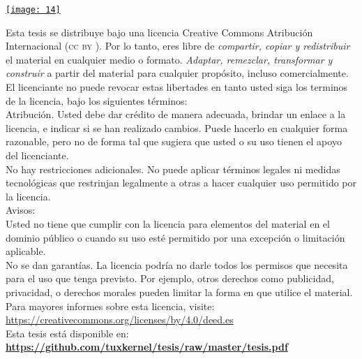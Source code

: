 \documentclass[14pt,letterpaper,twoside]{extbook} %
\begin{document}
\begin{scriptsize}
\begin{minipage}{7.5cm}
 
\begin{minipage}{7.5cm}
\href{https://creativecommons.org/licenses/by/4.0/deed.es}{\texttt{[image: 14]}} \\
\end{minipage}

\noindent Esta tesis se distribuye bajo una licencia Creative Commons Atribución  Internacional (\textsc{cc by} ). Por lo tanto, eres libre de \emph{compartir, copiar y redistribuir} el material en cualquier medio o formato. \emph{Adaptar, remezclar, transformar y construir} a partir del material para cualquier propósito, incluso comercialmente. El licenciante no puede revocar estas libertades en tanto usted siga los terminos de la licencia, bajo los siguientes términos: \\

\noindent \ccAttribution \thinspace Atribución. Usted debe dar crédito de manera adecuada, brindar un enlace a la licencia, e indicar si se han realizado cambios. Puede hacerlo en cualquier forma razonable, pero no de forma tal que sugiera que usted o su uso tienen el apoyo del licenciante. \\

\noindent No hay restricciones adicionales. No puede aplicar términos legales ni medidas tecnológicas que restrinjan legalmente a otras a hacer cualquier uso permitido por la licencia. \\

\noindent Avisos: \\

\noindent Usted no tiene que cumplir con la licencia para elementos del material en el dominio público o cuando su uso esté permitido por una excepción o limitación aplicable. \\

\noindent No se dan garantías. La licencia podría no darle todos los permisos que necesita para el uso que tenga previsto. Por ejemplo, otros derechos como publicidad, privacidad, o derechos morales pueden limitar la forma en que utilice el material. \\

\noindent Para mayores informes sobre esta licencia, visite: \\

\href{https://creativecommons.org/licenses/by/4.0/deed.es}{https://creativecommons.org/licenses/by/4.0/deed.es} \\

Esta tesis está disponible en: \\

\href{https://github.com/tuxkernel/tesis/raw/master/tesis.pdf}{\textbf{https://github.com/tuxkernel/tesis/raw/master/tesis.pdf}}
\end{minipage}
\end{scriptsize}
\end{document}

